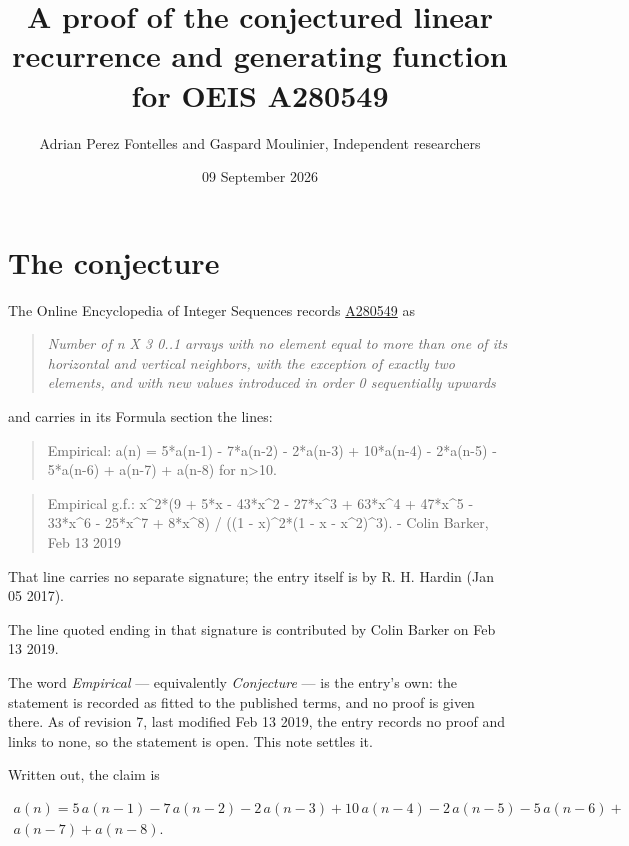 \documentclass[11pt]{article}
\title{A proof of the conjectured linear recurrence and generating function for OEIS A280549}
\author{Adrian Perez Fontelles and Gaspard Moulinier, Independent researchers}
\date{09 September 2026}
\theoremstyle{definition}
\begin{document}
\maketitle
\section{The conjecture}

The Online Encyclopedia of Integer Sequences records \href{https://oeis.org/A280549}{A280549} as

\begin{quote}\itshape Number of n X 3 0..1 arrays with no element equal to more than one of its horizontal and vertical neighbors, with the exception of exactly two elements, and with new values introduced in order 0 sequentially upwards\end{quote}

and carries in its Formula section the lines:

\begin{quote}\ttfamily Empirical: a(n) = 5*a(n-1) - 7*a(n-2) - 2*a(n-3) + 10*a(n-4) - 2*a(n-5) - 5*a(n-6) + a(n-7) + a(n-8) for n>10.\end{quote}

\begin{quote}\ttfamily Empirical g.f.: x\textasciicircum{}2*(9 + 5*x - 43*x\textasciicircum{}2 - 27*x\textasciicircum{}3 + 63*x\textasciicircum{}4 + 47*x\textasciicircum{}5 - 33*x\textasciicircum{}6 - 25*x\textasciicircum{}7 + 8*x\textasciicircum{}8) / ((1 - x)\textasciicircum{}2*(1 - x - x\textasciicircum{}2)\textasciicircum{}3). - Colin Barker, Feb 13 2019\end{quote}

That line carries no separate signature; the entry itself is by R. H. Hardin (Jan 05 2017).

The line quoted ending in that signature is contributed by Colin Barker on Feb 13 2019.

The word {\itshape Empirical} --- equivalently {\itshape Conjecture} --- is the entry's own: the statement is recorded as fitted to the published terms, and no proof is given there. As of revision 7, last modified Feb 13 2019, the entry records no proof and links to none, so the statement is open. This note settles it.

Written out, the claim is

\begin{multline*} a(n) = 5\,a(n-1) - 7\,a(n-2) - 2\,a(n-3) + 10\,a(n-4) - 2\,a(n-5) - 5\,a(n-6) + \\ a(n-7) + a(n-8). \end{multline*}
\end{document}

